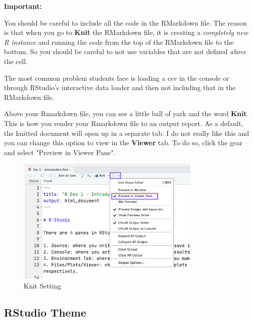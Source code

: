 \documentclass[12pt]{article}
\begin{document}
\begin{tcolorbox}[boxrule = 0pt, frame hidden, sharp corners, enhanced, borderline west = {4pt}{0pt}{kings_river}, interior hidden]
  {\large \textbf{Important:}}

  \smallskip
  You should be careful to include all the code in the RMarkdown file. The reason is that when you go to \textbf{Knit} the RMarkdown file, it is creating a \emph{completely new R instance} and running the code from the top of the RMarkdown file to the bottom. So you should be careful to not use variables that are not defined \emph{above} the cell.
  
  The most common problem students face is loading a csv in the console or through RStudio's interactive data loader and then not including that in the RMarkdown file. 
\end{tcolorbox}

Above your Rmarkdown file, you can see a little ball of yark and the word \textbf{Knit}. This is how you render your Rmarkdown file to an output report. As a default, the knitted document will open up in a separate tab. I do not really like this and you can change this option to view in the \textbf{Viewer} tab. To do so, click the gear and select "Preview in Viewer Pane".

\begin{figure}[!ht]
  \caption{Knit Setting}
  \label{fig:rstudio_knit_setting}
  \centering
  \includegraphics[width = 0.8\textwidth]{figures/rstudio_knit_setting.png}
\end{figure}



\subsection*{RStudio Theme}
\end{document}
